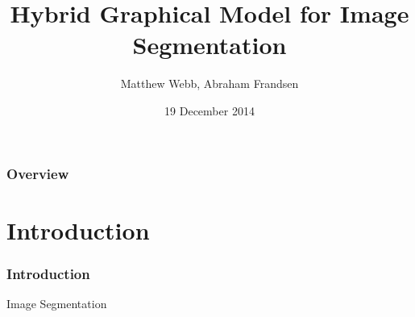 \documentclass{beamer}
\begin{document}

\title[Image Segmentation]{Hybrid Graphical Model for Image Segmentation}
\author{Matthew Webb, Abraham Frandsen}
\date{19 December 2014}


\begin{frame}
\titlepage
\end{frame}

\begin{frame}
    \frametitle{Overview}
    \tableofcontents
\end{frame}

\section{Introduction}
\begin{frame}
    \frametitle{Introduction}
\begin{center}
Image Segmentation
\end{center}
\end{frame}


\begin{comment}
\begin{frame}
\begin{figure}
\begin{align*}
&N, M \qquad &&\text{Dimensions of image (rows, columns).}\\
&d \qquad &&\text{Dimension of color space.}\\
&K \qquad &&\text{Number of segments/clusters.}\\
&X_{i,j}, \,\, 1\leq i \leq N, 1\leq j \leq M &&\text{Observed value for $(i,j)$-th pixel.}\\
&Z_{i,j}, \,\, 1\leq i \leq N, 1\leq j \leq M &&\text{Cluster assignment for $(i,j)$-th pixel.}\\
&\theta_k,\,\, 1\leq k \leq K &&\text{Parameter vector for cluster $k$.}\\
&X = (X_{i,j})_{1\leq i \leq N, 1 \leq j \leq M}\\
&Z = (Z_{i,j})_{1\leq i \leq N, 1 \leq j \leq M}\\
&\theta = (\theta_k)_{1\leq k \leq K}
\end{align*}
\caption{Basic notation.}
\label{equations}
\end{figure}
\end{frame}
\end{comment}
\end{document}
